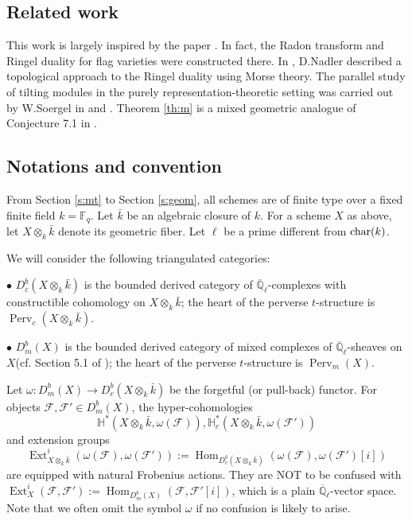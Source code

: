 \documentclass{amsart}
\theoremstyle{plain}
\theoremstyle{definition}
\theoremstyle{remark}
\numberwithin{equation}{subsection}
\begin{document}
\subsection{Related work}

This work is largely inspired by the paper \cite{BBM}. In fact, the Radon transform and Ringel duality for flag varieties were constructed there. In \cite{Na}, D.Nadler described a topological approach to the Ringel duality using Morse theory. The parallel study of tilting modules in the purely representation-theoretic setting was carried out by W.Soergel in \cite{Sg1} and \cite{Sg2}. Theorem \ref{th:m} is a mixed geometric analogue of Conjecture 7.1 in \cite{Sg1}.

\subsection{Notations and convention}
From Section \ref{s:mt} to Section \ref{s:geom}, all schemes are of finite type over a fixed finite field $k={\mathbb{F}}_q$. Let $\bar{k}$ be an algebraic closure of $k$. For a scheme $X$ as above, let ${{X}\otimes_k\bar{k}}$ denote its geometric fiber. Let $\ell$ be a prime different from $\textup{char}(k)$.

We will consider the following triangulated categories: 

\noindent$\bullet$ ${D^b_c({{{X}}\otimes_k\bar{k}})}$ is the bounded derived category of ${\overline{\mathbb{Q}}_{\ell}}$-complexes with constructible cohomology on ${{X}\otimes_k\bar{k}}$; the heart of the perverse $t$-structure is ${\operatorname{Perv}_c({{{X}}\otimes_k\bar{k}})}$.

\noindent$\bullet$ ${D^b_m({X})}$ is the bounded derived category of mixed complexes of ${\overline{\mathbb{Q}}_{\ell}}$-sheaves on $X$(cf. Section 5.1 of \cite{BBD}); the heart of the perverse $t$-structure is ${\operatorname{Perv}_m({X})}$.

Let $\omega:{D^b_m({X})}\to{D^b_c({{{X}}\otimes_k\bar{k}})}$ be the forgetful (or pull-back) functor. For objects ${\mathcal{F}},{\mathcal{F}}'\in{D^b_m({X})}$, the hyper-cohomologies 
\begin{equation*}
{\mathbb{H}}^*({{X}\otimes_k\bar{k}},\omega({\mathcal{F}})), {\mathbb{H}}^*_c({{X}\otimes_k\bar{k}},\omega({\mathcal{F}}'))
\end{equation*}
and extension groups 
\begin{equation*}
\operatorname{Ext}^i_{{{X}\otimes_k\bar{k}}}(\omega({\mathcal{F}}),\omega({\mathcal{F}}')):=\operatorname{Hom}_{{D^b_c({{{X}}\otimes_k\bar{k}})}}(\omega({\mathcal{F}}),\omega({\mathcal{F}}')[i])
\end{equation*}
are equipped with natural Frobenius actions. They are NOT to be confused with $\operatorname{Ext}^i_X({\mathcal{F}},{\mathcal{F}}'):=\operatorname{Hom}_{{D^b_m({X})}}({\mathcal{F}},{\mathcal{F}}'[i])$, which is a plain ${\overline{\mathbb{Q}}_{\ell}}$-vector space. Note that we often omit the symbol $\omega$ if no confusion is likely to arise.
\end{document}
